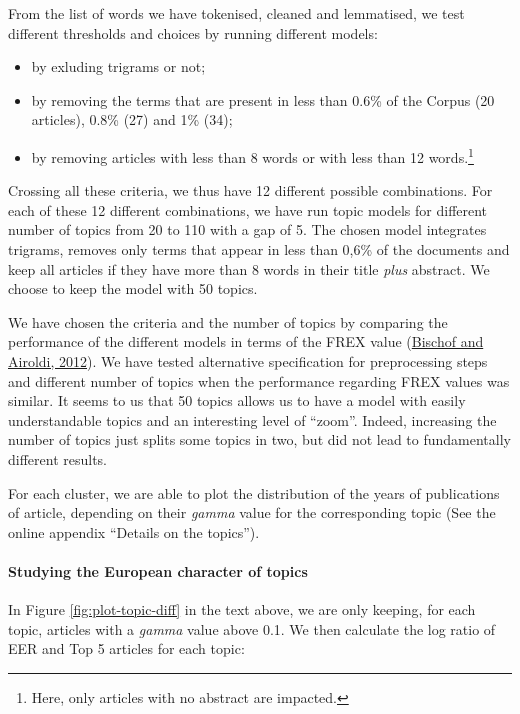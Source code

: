 \documentclass[
  12pt,
  onecolumn]{article}
\providecommand{\tightlist}{%
  \setlength{\itemsep}{0pt}\setlength{\parskip}{0pt}}
\begin{document}
From the list of words we have tokenised, cleaned and lemmatised, we
test different thresholds and choices by running different models:

\begin{itemize}
\tightlist
\item
  by exluding trigrams or not;
\item
  by removing the terms that are present in less than 0.6\% of the
  Corpus (20 articles), 0.8\% (27) and 1\% (34);
\item
  by removing articles with less than 8 words or with less than 12
  words.\footnote{Here, only articles with no abstract are impacted.}
\end{itemize}

Crossing all these criteria, we thus have 12 different possible
combinations. For each of these 12 different combinations, we have run
topic models for different number of topics from 20 to 110 with a gap of
5. The chosen model integrates trigrams, removes only terms that appear
in less than 0,6\% of the documents and keep all articles if they have
more than 8 words in their title \emph{plus} abstract. We choose to keep
the model with 50 topics.

We have chosen the criteria and the number of topics by comparing the
performance of the different models in terms of the FREX value
(\protect\hyperlink{ref-bischof2012}{Bischof and Airoldi, 2012}). We
have tested alternative specification for preprocessing steps and
different number of topics when the performance regarding FREX values
was similar. It seems to us that 50 topics allows us to have a model
with easily understandable topics and an interesting level of ``zoom''.
Indeed, increasing the number of topics just splits some topics in two,
but did not lead to fundamentally different results.

For each cluster, we are able to plot the distribution of the years of
publications of article, depending on their \emph{gamma} value for the
corresponding topic (See the online appendix ``Details on the topics'').

\hypertarget{studying-the-european-character-of-topics}{%
\paragraph*{Studying the European character of
topics}\label{studying-the-european-character-of-topics}}

In Figure \ref{fig:plot-topic-diff} in the text above, we are only
keeping, for each topic, articles with a \emph{gamma} value above 0.1.
We then calculate the log ratio of EER and Top 5 articles for each
topic:
\end{document}
